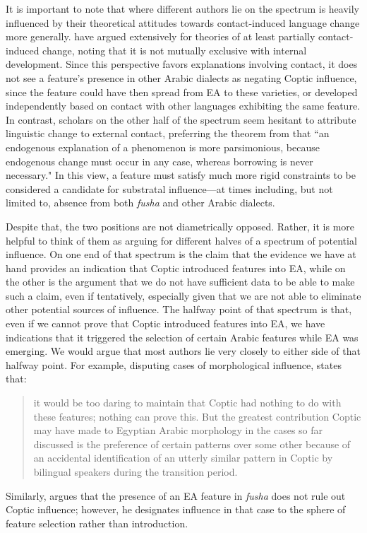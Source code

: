 \documentclass[12pt,a4paper]{article}
\newcounter{example}
\begin{document}
It is important to note that where different authors lie on the spectrum is heavily influenced by their theoretical attitudes towards contact-induced language change more generally. \textcite{lucas_contact_2010, lucas_typology_2022, lucas_contact_2020} have argued extensively for theories of at least partially contact-induced change, noting that it is not mutually exclusive with internal development. Since this perspective favors explanations involving contact, it does not see a feature's presence in other Arabic dialects as negating Coptic influence, since the feature could have then spread from EA to these varieties, or developed independently based on contact with other languages exhibiting the same feature. In contrast, scholars on the other half of the spectrum seem hesitant to attribute linguistic change to external contact, preferring the theorem from \textcite[653]{lass_historical_1998} that ``an endogenous explanation of a phenomenon is more parsimonious, because endogenous change must occur in any case, whereas borrowing is never necessary." In this view, a feature must satisfy much more rigid constraints to be considered a candidate for substratal influence---at times including, but not limited to, absence from both \textit{fusha} and other Arabic dialects.

Despite that, the two positions are not diametrically opposed. Rather, it is more helpful to think of them as arguing for different halves of a spectrum of potential influence. On one end of that spectrum is the claim that the evidence we have at hand provides an indication that Coptic introduced features into EA, while on the other is the argument that we do not have sufficient data to be able to make such a claim, even if tentatively, especially given that we are not able to eliminate other potential sources of influence. The halfway point of that spectrum is that, even if we cannot prove that Coptic introduced features into EA, we have indications that it triggered the selection of certain Arabic features while EA was emerging. We would argue that most authors lie very closely to either side of that halfway point. For example, disputing cases of morphological influence, \textcite[136]{palva_notes_1969} states that:
\begin{quote}
it would be too daring to maintain that Coptic had nothing to do with these features; nothing can prove this. But the greatest contribution Coptic may have made to Egyptian Arabic morphology in the cases so far discussed is the preference of certain patterns over some other because of an accidental identification of an utterly similar pattern in Coptic by bilingual speakers during the transition period.
\end{quote}
Similarly, \textcite{versteegh_whats_2004} argues that the presence of an EA feature in \textit{fusha} does not rule out Coptic influence; however, he designates influence in that case to the sphere of feature selection rather than introduction.
\end{document}
